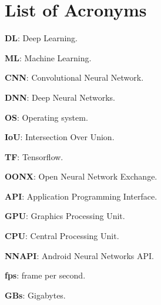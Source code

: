 \chapter*{List of Acronyms}


\textbf{DL}: Deep Learning. \par 
\textbf{ML}: Machine Learning. \par 
\textbf{CNN}:  Convolutional Neural Network. \par
\textbf{DNN}: Deep  Neural Networks.\par 
\textbf{OS}: Operating system.\par
\textbf{IoU}: Intersection Over Union.\par
\textbf{TF}: Tensorflow.\par
\textbf{OONX}: Open Neural Network Exchange. \par
\textbf{API}: Application Programming Interface.  \par
\textbf{GPU}: Graphics Processing Unit.  \par
\textbf{CPU}: Central Processing Unit.  \par
\textbf{NNAPI}: Android Neural Networks API.  \par
\textbf{fps}: frame per second.\par
\textbf{GBs}: Gigabytes.\par

